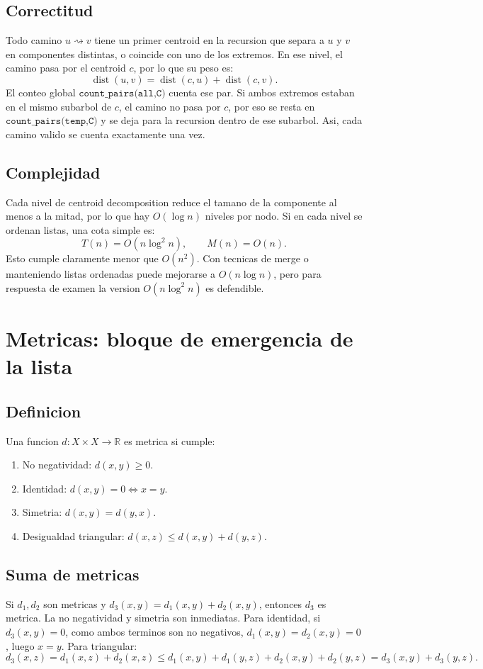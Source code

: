 \documentclass[10pt]{article}
\newcommand{\bigO}{O}
\newcommand{\dist}{\operatorname{dist}}
\begin{document}
\subsection{Correctitud}
Todo camino \(u\rightsquigarrow v\) tiene un primer centroid en la recursion que separa a \(u\) y \(v\) en
componentes distintas, o coincide con uno de los extremos. En ese nivel, el camino pasa por el centroid \(c\),
por lo que su peso es:
\[
\dist(u,v)=\dist(c,u)+\dist(c,v).
\]
El conteo global \(\texttt{count\_pairs(all,C)}\) cuenta ese par. Si ambos extremos estaban en el mismo subarbol
de \(c\), el camino no pasa por \(c\), por eso se resta en \(\texttt{count\_pairs(temp,C)}\) y se deja para la
recursion dentro de ese subarbol. Asi, cada camino valido se cuenta exactamente una vez.

\subsection{Complejidad}
Cada nivel de centroid decomposition reduce el tamano de la componente al menos a la mitad, por lo que hay
\(\bigO(\log n)\) niveles por nodo. Si en cada nivel se ordenan listas, una cota simple es:
\[
T(n)=\bigO(n\log^2 n), \qquad M(n)=\bigO(n).
\]
Esto cumple claramente menor que \(\bigO(n^2)\). Con tecnicas de merge o manteniendo listas ordenadas puede
mejorarse a \(\bigO(n\log n)\), pero para respuesta de examen la version \(\bigO(n\log^2 n)\) es defendible.

\newpage

\section{Metricas: bloque de emergencia de la lista}

\subsection{Definicion}
Una funcion \(d:X\times X\to \mathbb{R}\) es metrica si cumple:
\begin{enumerate}
\item No negatividad: \(d(x,y)\ge 0\).
\item Identidad: \(d(x,y)=0 \Leftrightarrow x=y\).
\item Simetria: \(d(x,y)=d(y,x)\).
\item Desigualdad triangular: \(d(x,z)\le d(x,y)+d(y,z)\).
\end{enumerate}

\subsection{Suma de metricas}
Si \(d_1,d_2\) son metricas y \(d_3(x,y)=d_1(x,y)+d_2(x,y)\), entonces \(d_3\) es metrica.
La no negatividad y simetria son inmediatas. Para identidad, si \(d_3(x,y)=0\), como ambos terminos son no
negativos, \(d_1(x,y)=d_2(x,y)=0\), luego \(x=y\). Para triangular:
\[
d_3(x,z)=d_1(x,z)+d_2(x,z)
\le d_1(x,y)+d_1(y,z)+d_2(x,y)+d_2(y,z)
=d_3(x,y)+d_3(y,z).
\]
\end{document}
